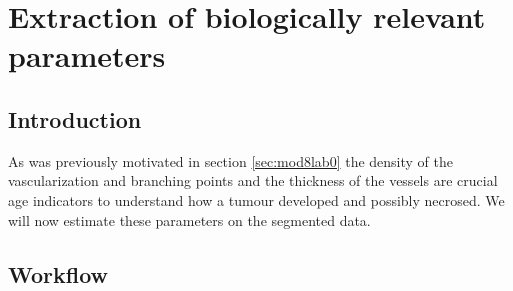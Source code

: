 \section{Extraction of biologically relevant parameters}

\subsection{Introduction}
As was previously motivated in section \ref{sec:mod8lab0} the density of the vascularization and branching points and the thickness of the vessels are crucial age indicators to understand how a tumour developed and possibly necrosed. We will now estimate these parameters on the segmented data.

\subsection{Workflow}

